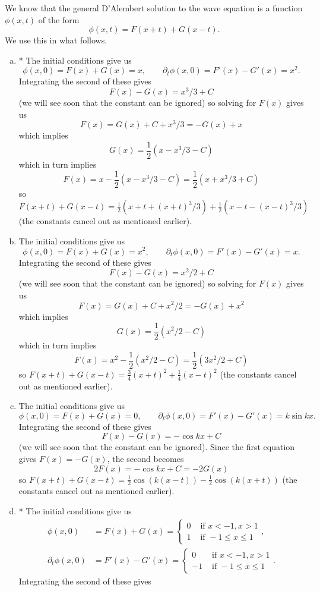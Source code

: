 \documentclass[12pt]{article}
\begin{document}
\iffalse
\begin{answer}
We know that the general D'Alembert solution to the wave equation is a function $\phi(x,t)$ of the form
\[\phi(x,t)=F(x+t)+G(x-t).\]
We use this in what follows.
\begin{enumerate}[(a)]
\item * The initial conditions give us
\[\phi(x,0)=F(x)+G(x)=x,\qquad\partial_t\phi(x,0)=F'(x)-G'(x)=x^2.\]
Integrating the second of these gives
\[F(x)-G(x)=x^3/3+C\]
(we will see soon that the constant can be ignored) so solving for $F(x)$ gives us
\[F(x)=G(x)+C+x^3/3=-G(x)+x\]
which implies
\[G(x)=\frac{1}{2}(x-x^3/3-C)\]
which in turn implies
\[F(x)=x-\frac{1}{2}(x-x^3/3-C)=\frac{1}{2}(x+x^3/3+C)\]
so $F(x+t)+G(x-t)=\frac{1}{2}(x+t+(x+t)^3/3)+\frac{1}{2}(x-t-(x-t)^3/3)$ (the constants cancel out as mentioned earlier).
\item  The initial conditions give us
\[\phi(x,0)=F(x)+G(x)=x^2,\qquad\partial_t\phi(x,0)=F'(x)-G'(x)=x.\]
Integrating the second of these gives
\[F(x)-G(x)=x^2/2+C\]
(we will see soon that the constant can be ignored) so solving for $F(x)$ gives us
\[F(x)=G(x)+C+x^2/2=-G(x)+x^2\]
which implies
\[G(x)=\frac{1}{2}(x^2/2-C)\]
which in turn implies
\[F(x)=x^2-\frac{1}{2}(x^2/2-C)=\frac{1}{2}(3x^2/2+C)\]
so $F(x+t)+G(x-t)=\frac{3}{4}(x+t)^2+\frac{1}{4}(x-t)^2$ (the constants cancel out as mentioned earlier).
\item The initial conditions give us
\[\phi(x,0)=F(x)+G(x)=0,\qquad\partial_t\phi(x,0)=F'(x)-G'(x)=k\sin kx.\]
Integrating the second of these gives
\[F(x)-G(x)=-\cos kx+C\]
(we will see soon that the constant can be ignored). Since the first equation gives $F(x)=-G(x)$, the second becomes
\[2F(x)=-\cos kx+C=-2G(x)\]
so $F(x+t)+G(x-t)=\frac{1}{2}\cos(k(x-t))-\frac{1}{2}\cos(k(x+t))$ (the constants cancel out as mentioned earlier).
\item * The initial conditions give us
\begin{align*}
\phi(x,0)&=F(x)+G(x)=\begin{cases}
0&\mbox{ if }x<-1,x>1\\
1&\mbox{ if }-1\leq x\leq 1
\end{cases},\\
\partial_t\phi(x,0)&=F'(x)-G'(x)=\begin{cases}
0&\mbox{ if }x<-1,x>1\\
-1&\mbox{ if }-1\leq x\leq 1
\end{cases}.\end{align*}
Integrating the second of these gives

\end{enumerate}
\end{answer}
\end{document}
